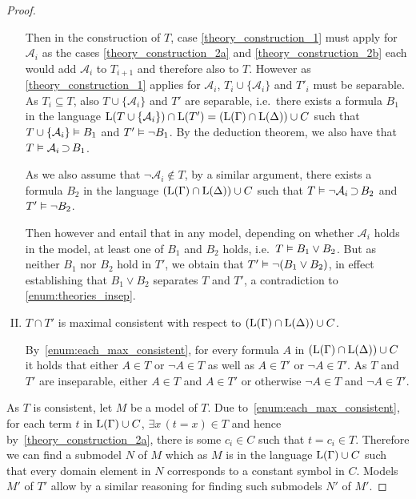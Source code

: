 \begin{proof}
\begin{enumerate}[I.]
			Then in the construction of $T$, case \ref{theory_construction_1} must apply for $\mathcal{A}_i$ as the cases \ref{theory_construction_2a} and \ref{theory_construction_2b} each would add $\mathcal{A}_i$ to $T_{i+1}$ and therefore also to $T$.
			However as \ref{theory_construction_1} applies for $\mathcal{A}_i$, $T_i \cup \{\mathcal{A}_i\}$ and $T'_i$ must be separable.
			As $T_i \subseteq T$, also
			$T \cup \{\mathcal{A}_i\}$ and $T'$ are separable, i.e.\ there exists a formula $B_1$ in the language $\operatorname{L}(T\cup\{\mathcal{A}_i\}) \cap \operatorname{L}(T') = (\operatorname{L}(\Gamma) \cap \operatorname{L}(\Delta)) \cup C$ such that
			$T \cup \{\mathcal{A}_i\} \vDash B_1$ and $T' \vDash \lnot B_1$.
			By the deduction theorem, we also have that \markA{}~$T \vDash \mathcal{A}_i \operatorname{\supset} B_1$.

			As we also assume that $\lnot \mathcal{A}_i \not\in T$, by a similar argument, there exists a formula $B_2$ in the language  $(\operatorname{L}(\Gamma) \cap \operatorname{L}(\Delta)) \cup C$ such that 
			\markB{} $T \vDash \lnot \mathcal{A}_i \operatorname{\supset} B_2$ and $T' \vDash \lnot B_2$.

			Then however \markA{} and \markB{} entail that in any model, depending on whether $\mathcal{A}_i$ holds in the model, at least one of $B_1$ and $B_2$ holds, i.e.\ $T \vDash B_1 \lor B_2$.
			But as neither $B_1$ nor $B_2$ hold in $T'$, we obtain that $T' \vDash \lnot (B_1 \lor B_2)$, in effect establishing that $B_1 \lor B_2$ separates $T$ and $T'$, a contradiction to \ref{enum:theories_insep}.


		\item
			\label{enum:intersection_consistent}
			$T \cap T'$ is maximal consistent with respect to $(\operatorname{L}(\Gamma) \cap \operatorname{L}(\Delta)) \cup C$.

			By~\ref{enum:each_max_consistent}, for every formula $A$ in $(\operatorname{L}(\Gamma) \cap \operatorname{L}(\Delta)) \cup C$ it holds that either 
			$A \in T$ or $\lnot A \in T$ as well as
			$A \in T'$ or $\lnot A \in T'$. As $T$ and $T'$ are inseparable, either $A \in T$ and $A\in T'$ or otherwise $\lnot A \in T$ and $\lnot A \in T'$.

	\end{enumerate}


	As $T$ is consistent, let $M$ be a model of $T$.
	Due to~\ref{enum:each_max_consistent}, for each term $t$ in $\operatorname{L}(\Gamma)\cup C$, $\exists x\, (t = x) \in T$ and hence by~\ref{theory_construction_2a}, there is some $c_i \in C$ such that $t=c_i \in T$.
	Therefore we can find a submodel $N$ of $M$ which as $M$ is in the language $\operatorname{L}(\Gamma)\cup C$ such that
	every domain element in $N$ corresponds to a constant symbol in $C$.
	Models $M'$ of $T'$ allow by a similar reasoning for finding such submodels $N'$ of $M'$.


\end{proof}
